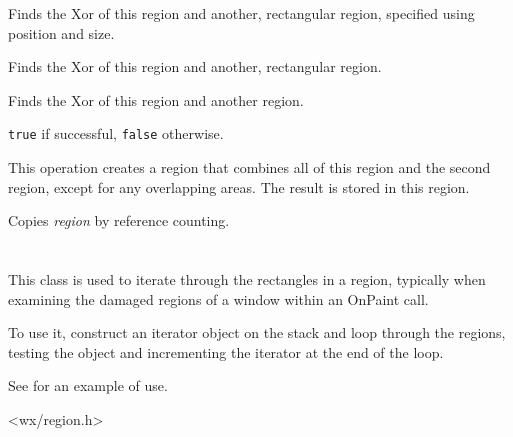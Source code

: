 \label{wxregionxor}


Finds the Xor of this region and another, rectangular region, specified using position and size.


Finds the Xor of this region and another, rectangular region.


Finds the Xor of this region and another region.


{\tt true} if successful, {\tt false} otherwise.


This operation creates a region that combines all of this region and the second region, except
for any overlapping areas. The result is stored in this region.

\label{wxregionassign}


Copies {\it region} by reference counting.

\section{}\label{wxregioniterator}

This class is used to iterate through the rectangles in a region,
typically when examining the damaged regions of a window within an OnPaint call.

To use it, construct an iterator object on the stack and loop through the
regions, testing the object and incrementing the iterator at the end of the loop.

See  for an example of use.




<wx/region.h>



